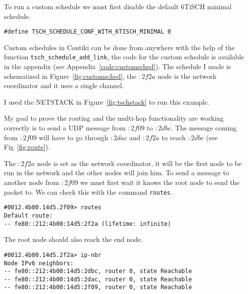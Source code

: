 To run a custom schedule we must first disable the default 6TiSCH minimal schedule.

\begin{lstlisting}
#define TSCH_SCHEDULE_CONF_WITH_6TISCH_MINIMAL 0
\end{lstlisting}

Custom schedules in Contiki can be done from anywhere with the help of the
function \lstinline{tsch_schedule_add_link}, the code for the custom schedule
is available in the appendix (see Appendix~\ref{code:customsched}).
The schedule I made is schematized in Figure~\ref{fig:customsched}, the $:2f2a$
node is the network coordinator and it uses a single channel.



I used the NETSTACK in Figure~\ref{fig:tschstack} to run this example.



My goal to prove the routing and the multi-hop functionality are working
correctly is to send a UDP message from $:2f09$ to $:2dbc$.
The message coming from $:2f09$ will have to go through $:2dac$ and $:2f2a$ to
reach $:2dbc$ (see Fig~\ref{fig:route}).





The $:2f2a$ node is set as the network coordinator, it will be the first node to be
run in the network and the other nodes will join him.
To send a message to another node from $:2f09$ we must first wait it
knows the root node to send the packet to.
We can check this with the command \lstinline{routes}.

\begin{lstlisting}[language=none]
#0012.4b00.14d5.2f09> routes
Default route:
-- fe80::212:4b00:14d5:2f2a (lifetime: infinite)
\end{lstlisting}

The root node should also reach the end node.

\begin{lstlisting}[language=none]
#0012.4b00.14d5.2f2a> ip-nbr
Node IPv6 neighbors:
-- fe80::212:4b00:14d5:2dbc, router 0, state Reachable
-- fe80::212:4b00:14d5:2dac, router 0, state Reachable
-- fe80::212:4b00:14d5:2f09, router 0, state Reachable
\end{lstlisting}

